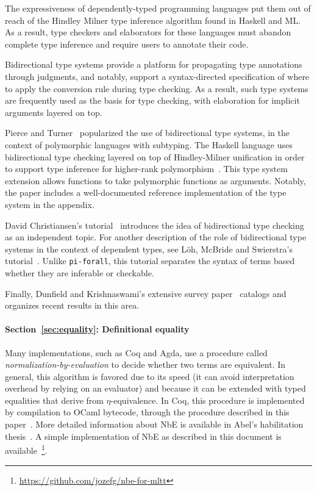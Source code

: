 \documentclass{article}
\newcommand\pif{\texttt{pi-forall}\xspace}
\theoremstyle{definition}
\begin{document}
The expressiveness of dependently-typed programming languages put them out of
reach of the Hindley Milner type inference algorithm found in Haskell and
ML. As a result, type checkers and elaborators for these languages must
abandon complete type inference and require users to annotate their code.

Bidirectional type systems provide a platform for propagating type annotations
through judgments, and notably, support a syntax-directed specification of
where to apply the conversion rule during type checking. As a result, such
type systems are frequently used as the basis for type checking, with
elaboration for implicit arguments layered on top.

Pierce and Turner~\cite{pierce:lti} popularized the use of bidirectional type
systems, in the context of polymorphic languages with subtyping.  The Haskell
language uses bidirectional type checking layered on top of Hindley-Milner
unification in order to support type inference for higher-rank
polymorphism~\cite{practical-type-inference}. This type system extension
allows functions to take polymorphic functions as arguments. Notably, the
paper includes a well-documented reference implementation of the type system
in the appendix.

David Christiansen's tutorial~\cite{christiansen:tutorial-bidirectional}
introduces the idea of bidirectional type checking as an independent
topic. For another description of the role of bidirectional type systems in
the context of dependent types, see L\"oh, McBride and Swierstra's
tutorial~\cite{loeh:tutorial}. Unlike \pif, this tutorial separates the syntax
of terms based whether they are inferable or checkable.

Finally, Dunfield and Krishnaswami's extensive survey
paper~\cite{dunfield:bidirectional-survey} catalogs and organizes recent
results in this area.

\paragraph{Section~\ref{sec:equality}: Definitional equality}

Many implementations, such as Coq and Agda, use a procedure called
\emph{normalization-by-evaluation} to decide whether two terms are
equivalent. In general, this algorithm is favored due to its speed (it can
avoid interpretation overhead by relying on an evaluator) and because it can
be extended with typed equalities that derive from $\eta$-equivalence.  In
Coq, this procedure is implemented by compilation to OCaml bytecode, through
the procedure described in this paper~\cite{gregoire:strong-reduction}. More
detailed information about NbE is available in Abel's habilitation
thesis~\cite{abel_2013}. A simple implementation of NbE as described in this
document is available~\footnote{\url{https://github.com/jozefg/nbe-for-mltt}}.
\end{document}
